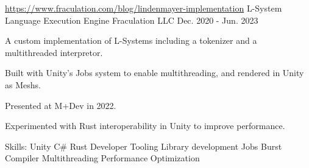 \begin{cventries}
  \cventry
   {\href{https://www.fraculation.com/blog/lindenmayer-implementation}{https://www.fraculation.com/blog/lindenmayer-implementation}} %
    {L-System Language Execution Engine} %
    {Fraculation LLC} %
    {Dec. 2020 - Jun. 2023} %
    {
      \begin{cvitems} %
        \item {A custom implementation of L-Systems including a tokenizer and a multithreaded interpretor.}
        \item {Built with Unity's Jobs system to enable multithreading, and rendered in Unity as Meshs.}
        \item {Presented at M+Dev in 2022.}
        \item {Experimented with Rust interoperability in Unity to improve performance.}
        \item {Skills: Unity \textbullet{} C\# \textbullet{} Rust \textbullet{} Developer Tooling \textbullet{} Library development  \textbullet{} Jobs \textbullet{} Burst Compiler \textbullet{} Multithreading \textbullet{} Performance Optimization}
      \end{cvitems}
    }

\end{cventries}
    